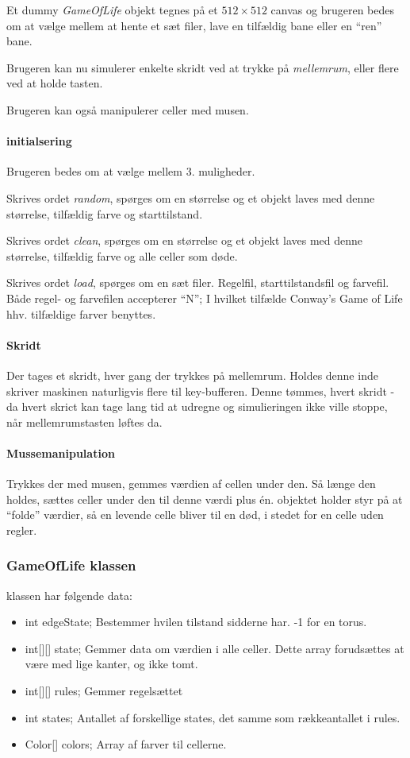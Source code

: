 Et dummy \emph{GameOfLife} objekt tegnes på et $512\times512$ canvas og
brugeren bedes om at vælge mellem at hente et sæt filer, lave en tilfældig bane eller en ``ren'' bane.

Brugeren kan nu simulerer enkelte skridt ved at trykke på \emph{mellemrum},
eller flere ved at holde tasten.

Brugeren kan også manipulerer celler med musen.

\paragraph{ \gol initialsering }
Brugeren bedes om at vælge mellem 3. muligheder.

Skrives ordet \emph{random}, spørges om en størrelse og et \gol objekt laves med denne størrelse, tilfældig farve og starttilstand.

Skrives ordet \emph{clean}, spørges om en størrelse og et \gol objekt laves med denne størrelse, tilfældig farve og alle celler som døde.

Skrives ordet \emph{load}, spørges om en sæt filer.
Regelfil, starttilstandsfil og farvefil. Både regel- og farvefilen accepterer ``N'';
I hvilket tilfælde Conway's Game of Life hhv. tilfældige farver benyttes.

\paragraph{ Skridt }
Der tages et skridt, hver gang der trykkes på mellemrum. Holdes denne inde skriver maskinen naturligvis flere til key-bufferen.
Denne tømmes, hvert skridt - da hvert skrict kan tage lang tid at udregne og simulieringen ikke ville stoppe, når mellemrumstasten løftes da.

\paragraph{ Mussemanipulation }
Trykkes der med musen, gemmes værdien af cellen under den. Så længe den holdes, sættes celler under den til denne værdi plus én.
\gol objektet holder styr på at ``folde'' værdier, så en levende celle bliver til en død, i stedet for en celle uden regler.


\subsubsection{ GameOfLife klassen}

\gol klassen har følgende data:
\begin{itemize}
  \item int edgeState; Bestemmer hvilen tilstand sidderne har. -1 for en torus.
  \item int[][] state; Gemmer data om værdien i alle celler. Dette array forudsættes at være med lige kanter, og ikke tomt.
  \item int[][] rules; Gemmer regelsættet
  \item int states; Antallet af forskellige states, det samme som rækkeantallet i rules.
  \item Color[] colors; Array af farver til cellerne.
\end{itemize}




